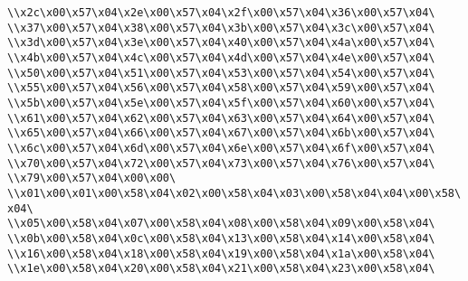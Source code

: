\verb|\\x2c\x00\x57\x04\x2e\x00\x57\x04\x2f\x00\x57\x04\x36\x00\x57\x04\|\newline
\verb|\\x37\x00\x57\x04\x38\x00\x57\x04\x3b\x00\x57\x04\x3c\x00\x57\x04\|\newline
\verb|\\x3d\x00\x57\x04\x3e\x00\x57\x04\x40\x00\x57\x04\x4a\x00\x57\x04\|\newline
\verb|\\x4b\x00\x57\x04\x4c\x00\x57\x04\x4d\x00\x57\x04\x4e\x00\x57\x04\|\newline
\verb|\\x50\x00\x57\x04\x51\x00\x57\x04\x53\x00\x57\x04\x54\x00\x57\x04\|\newline
\verb|\\x55\x00\x57\x04\x56\x00\x57\x04\x58\x00\x57\x04\x59\x00\x57\x04\|\newline
\verb|\\x5b\x00\x57\x04\x5e\x00\x57\x04\x5f\x00\x57\x04\x60\x00\x57\x04\|\newline
\verb|\\x61\x00\x57\x04\x62\x00\x57\x04\x63\x00\x57\x04\x64\x00\x57\x04\|\newline
\verb|\\x65\x00\x57\x04\x66\x00\x57\x04\x67\x00\x57\x04\x6b\x00\x57\x04\|\newline
\verb|\\x6c\x00\x57\x04\x6d\x00\x57\x04\x6e\x00\x57\x04\x6f\x00\x57\x04\|\newline
\verb|\\x70\x00\x57\x04\x72\x00\x57\x04\x73\x00\x57\x04\x76\x00\x57\x04\|\newline
\verb|\\x79\x00\x57\x04\x00\x00\|\newline
\verb|\\x01\x00\x01\x00\x58\x04\x02\x00\x58\x04\x03\x00\x58\x04\x04\x00\x58\x04\|\newline
\verb|\\x05\x00\x58\x04\x07\x00\x58\x04\x08\x00\x58\x04\x09\x00\x58\x04\|\newline
\verb|\\x0b\x00\x58\x04\x0c\x00\x58\x04\x13\x00\x58\x04\x14\x00\x58\x04\|\newline
\verb|\\x16\x00\x58\x04\x18\x00\x58\x04\x19\x00\x58\x04\x1a\x00\x58\x04\|\newline
\verb|\\x1e\x00\x58\x04\x20\x00\x58\x04\x21\x00\x58\x04\x23\x00\x58\x04\|\newline
